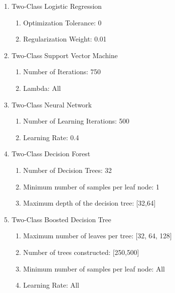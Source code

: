 \begin{enumerate}
    \item{Two-Class Logistic Regression}
    
    \begin{enumerate}
        \item{Optimization Tolerance:} 0
        \item{Regularization Weight:} 0.01
    \end{enumerate}
    
    \item{Two-Class Support Vector Machine}
    
    \begin{enumerate}
        \item{Number of Iterations:} 750
        \item{Lambda:} All
    \end{enumerate}
    
    \item{Two-Class Neural Network}
    
    \begin{enumerate}
        \item{Number of Learning Iterations:} 500
        \item{Learning Rate:} 0.4
    \end{enumerate}
    
    \item{Two-Class Decision Forest}

    \begin{enumerate}
        \item{Number of Decision Trees:} 32
        \item{Minimum number of samples per leaf node:} 1
        \item{Maximum depth of the decision tree:} [32,64]
    \end{enumerate}
    
    \item{Two-Class Boosted Decision Tree}
    
    \begin{enumerate}
        \item{Maximum number of leaves per tree:} [32, 64, 128]
        \item{Number of trees constructed:} [250,500]
        \item{Minimum number of samples per leaf node:} All
        \item{Learning Rate:} All
    \end{enumerate}
    
\end{enumerate}


